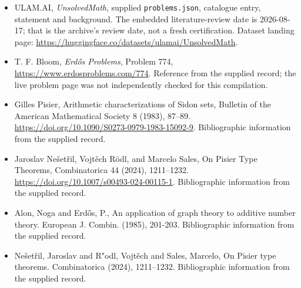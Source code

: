 \documentclass[11pt,a4paper]{article}
\begin{document}
{\small

\begin{itemize}

\item[\hypertarget{source:statement:1}{S1}] ULAM.AI, \emph{UnsolvedMath}, supplied \texttt{problems.json}, catalogue entry, statement and background. The embedded literature-review date is 2026-08-17; that is the archive’s review date, not a fresh certification. Dataset landing page: \url{https://huggingface.co/datasets/ulamai/UnsolvedMath}.

\item[\hypertarget{source:statement:2}{S2}] T. F. Bloom, \emph{Erdős Problems}, Problem 774, \url{https://www.erdosproblems.com/774}. Reference from the supplied record; the live problem page was not independently checked for this compilation.

\item[\hypertarget{source:statement:3}{S3}] Gilles Pisier, Arithmetic characterizations of Sidon sets, Bulletin of the American Mathematical Society 8 (1983), 87--89. \url{https://doi.org/10.1090/S0273-0979-1983-15092-9}. Bibliographic information from the supplied record.

\item[\hypertarget{source:statement:4}{S4}] Jaroslav Nešetřil, Vojtěch Rödl, and Marcelo Sales, On Pisier Type Theorems, Combinatorica 44 (2024), 1211--1232. \url{https://doi.org/10.1007/s00493-024-00115-1}. Bibliographic information from the supplied record.

\item[\hypertarget{source:statement:5}{S5}] Alon, Noga and Erd\H{o}s, P., An application of graph theory to additive number theory. European J. Combin. (1985), 201-203. Bibliographic information from the supplied record.

\item[\hypertarget{source:statement:6}{S6}] Ne\v set\v ril, Jaroslav and R"odl, Vojt\v ech and Sales, Marcelo, On {P}isier type theorems. Combinatorica (2024), 1211--1232. Bibliographic information from the supplied record.

\end{itemize}

}

\label{end:statement}
\end{document}

